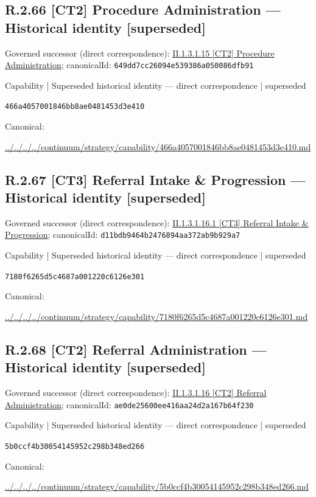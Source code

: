 \documentclass[10pt,a4paper]{article}
\begin{document}
\subsection*{R.2.66 [CT2] Procedure Administration — Historical identity [superseded]}
Governed successor (direct correspondence): \hyperref[element-649dd7cc26094e539386a050086dfb91]{II.1.3.1.15 [CT2] Procedure Administration}; canonicalId: \texttt{649dd7cc26094e539386a050086dfb91}\par
\label{element-466a4057001846bb8ae0481453d3e410}
{\small Capability | Superseded historical identity — direct correspondence | superseded}\par
\texttt{466a4057001846bb8ae0481453d3e410}\par
Canonical: \par
{\footnotesize\url{../../../../continuum/strategy/capability/466a4057001846bb8ae0481453d3e410.md}}\par
\subsection*{R.2.67 [CT3] Referral Intake \& Progression — Historical identity [superseded]}
Governed successor (direct correspondence): \hyperref[element-d11bdb9464b2476894aa372ab9b929a7]{II.1.3.1.16.1 [CT3] Referral Intake \& Progression}; canonicalId: \texttt{d11bdb9464b2476894aa372ab9b929a7}\par
\label{element-7180f6265d5c4687a001220c6126e301}
{\small Capability | Superseded historical identity — direct correspondence | superseded}\par
\texttt{7180f6265d5c4687a001220c6126e301}\par
Canonical: \par
{\footnotesize\url{../../../../continuum/strategy/capability/7180f6265d5c4687a001220c6126e301.md}}\par
\subsection*{R.2.68 [CT2] Referral Administration — Historical identity [superseded]}
Governed successor (direct correspondence): \hyperref[element-ae0de25600ee416aa24d2a167b64f230]{II.1.3.1.16 [CT2] Referral Administration}; canonicalId: \texttt{ae0de25600ee416aa24d2a167b64f230}\par
\label{element-5b0ccf4b30054145952c298b348ed266}
{\small Capability | Superseded historical identity — direct correspondence | superseded}\par
\texttt{5b0ccf4b30054145952c298b348ed266}\par
Canonical: \par
{\footnotesize\url{../../../../continuum/strategy/capability/5b0ccf4b30054145952c298b348ed266.md}}\par
\end{document}
